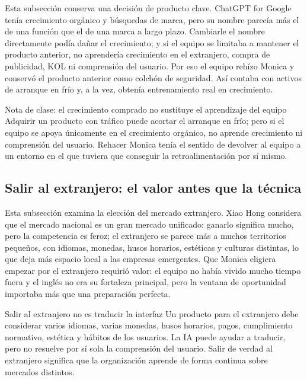 \documentclass[a4paper]{article}
\begin{document}
Esta subsección conserva una decisión de producto clave. ChatGPT for Google tenía crecimiento orgánico y búsquedas de marca, pero su nombre parecía más el de una función que el de una marca a largo plazo. Cambiarle el nombre directamente podía dañar el crecimiento; y si el equipo se limitaba a mantener el producto anterior, no aprendería crecimiento en el extranjero, compra de publicidad, KOL ni comprensión del usuario. Por eso el equipo rehízo Monica y conservó el producto anterior como colchón de seguridad. Así contaba con activos de arranque en frío y, a la vez, obtenía entrenamiento real en crecimiento.

\begin{importantbox}{Nota de clase: el crecimiento comprado no sustituye el aprendizaje del equipo}
Adquirir un producto con tráfico puede acortar el arranque en frío; pero si el equipo se apoya únicamente en el crecimiento orgánico, no aprende crecimiento ni comprensión del usuario. Rehacer Monica tenía el sentido de devolver al equipo a un entorno en el que tuviera que conseguir la retroalimentación por sí mismo.
\end{importantbox}

\subsection{Salir al extranjero: el valor antes que la técnica}

Esta subsección examina la elección del mercado extranjero. Xiao Hong considera que el mercado nacional es un gran mercado unificado: ganarlo significa mucho, pero la competencia es feroz; el extranjero se parece más a muchos territorios pequeños, con idiomas, monedas, husos horarios, estéticas y culturas distintas, lo que deja más espacio local a las empresas emergentes. Que Monica eligiera empezar por el extranjero requirió valor: el equipo no había vivido mucho tiempo fuera y el inglés no era su fortaleza principal, pero la ventana de oportunidad importaba más que una preparación perfecta.

\begin{warningbox}{Salir al extranjero no es traducir la interfaz}
Un producto para el extranjero debe considerar varios idiomas, varias monedas, husos horarios, pagos, cumplimiento normativo, estética y hábitos de los usuarios. La IA puede ayudar a traducir, pero no resuelve por sí sola la comprensión del usuario. Salir de verdad al extranjero significa que la organización aprende de forma continua sobre mercados distintos.
\end{warningbox}
\end{document}
